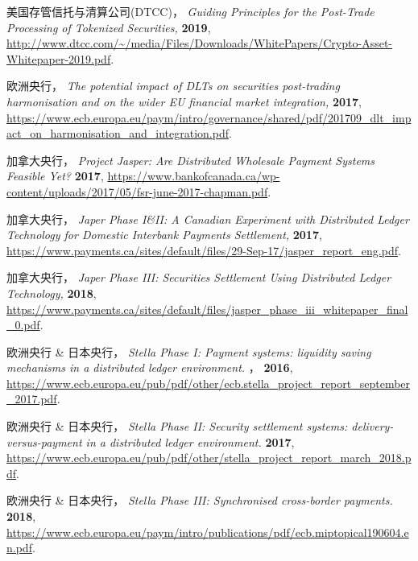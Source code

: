 \begin{thebibliography}{99}
     美国存管信托与清算公司(DTCC)，
    \newblock \textit{Guiding Principles for the Post-Trade Processing of  Tokenized Securities, }
    \newblock \textbf{2019},
    \newblock \url{http://www.dtcc.com/~/media/Files/Downloads/WhitePapers/Crypto-Asset-Whitepaper-2019.pdf}.

     欧洲央行，
    \newblock \textit{The potential impact of DLTs on securities post-trading harmonisation and on the wider EU financial market integration, }
    \newblock \textbf{2017},
    \newblock \url{https://www.ecb.europa.eu/paym/intro/governance/shared/pdf/201709_dlt_impact_on_harmonisation_and_integration.pdf}.

     加拿大央行，
    \newblock \textit{Project Jasper: Are Distributed Wholesale Payment Systems Feasible Yet?}
    \newblock \textbf{2017},
    \newblock \url{https://www.bankofcanada.ca/wp-content/uploads/2017/05/fsr-june-2017-chapman.pdf}.

     加拿大央行，
    \newblock \textit{Japer Phase I\&II: A Canadian Experiment with Distributed Ledger Technology for Domestic Interbank Payments Settlement, }
    \newblock \textbf{2017},
    \newblock \url{https://www.payments.ca/sites/default/files/29-Sep-17/jasper_report_eng.pdf}.

     加拿大央行，
    \newblock \textit{Japer Phase III: Securities Settlement Using Distributed Ledger Technology, }
    \newblock \textbf{2018},
    \newblock \url{https://www.payments.ca/sites/default/files/jasper_phase_iii_whitepaper_final_0.pdf}.
    
     欧洲央行 \& 日本央行，
    \newblock \textit{Stella Phase I: Payment systems: liquidity saving mechanisms in a distributed ledger environment. }，
    \newblock \textbf{2016},
    \newblock \url{https://www.ecb.europa.eu/pub/pdf/other/ecb.stella_project_report_september_2017.pdf}.
    
     欧洲央行 \& 日本央行，
    \newblock \textit{Stella Phase II: Security settlement systems: delivery-versus-payment in a distributed ledger environment. }
    \newblock \textbf{2017},
    \newblock \url{https://www.ecb.europa.eu/pub/pdf/other/stella_project_report_march_2018.pdf}.

     欧洲央行 \& 日本央行，
    \newblock \textit{Stella Phase III: Synchronised cross-border payments. }
    \newblock \textbf{2018},
    \newblock \url{https://www.ecb.europa.eu/paym/intro/publications/pdf/ecb.miptopical190604.en.pdf}.


\end{thebibliography}
